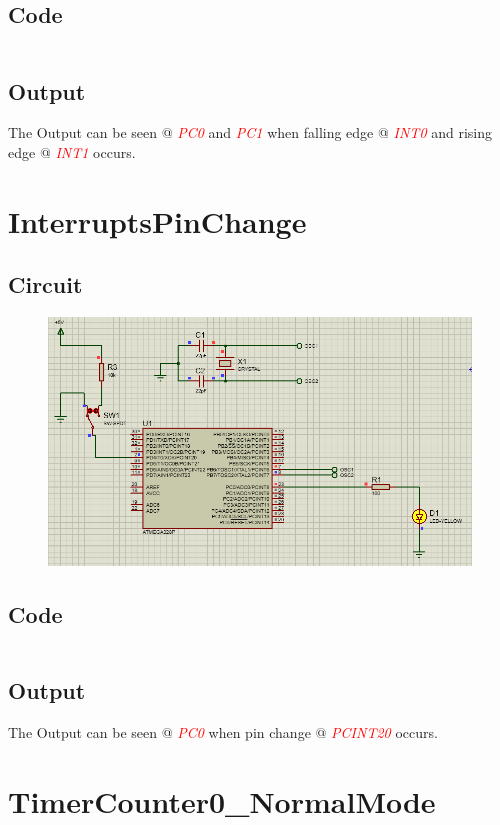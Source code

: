 \documentclass[oneside]{book}
\newcommand{\pinFormat}[1]{\emph{\textcolor{red}{#1}}}
\begin{document}
\subsection{Code}
\inputminted[breaklines,bgcolor=black]{c}{./programFiles/InterruptsExternal.c}
\subsection{Output}
\quad The Output can be seen @ \pinFormat{PC0} and \pinFormat{PC1} when falling edge @ \pinFormat{INT0} and rising edge @ \pinFormat{INT1} occurs.


\section{InterruptsPinChange}
\subsection{Circuit}
\begin{figure}[H]
    \centering
    \includegraphics[height=0.2\textheight]{InterruptsPinChange.png}
\end{figure}
\subsection{Code}
\inputminted[breaklines,bgcolor=black]{c}{./programFiles/InterruptsPinChange.c}
\subsection{Output}
\quad The Output can be seen @ \pinFormat{PC0} when pin change @ \pinFormat{PCINT20} occurs.


\section{TimerCounter0\_NormalMode}
\end{document}
